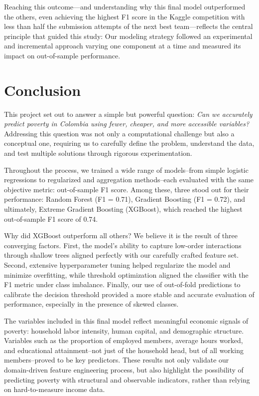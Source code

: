 \documentclass[12pt,a4paper,onecolumn]{article}
\begin{document}
Reaching this outcome—and understanding why this final model outperformed the others, even achieving the highest F1 score in the Kaggle competition with less than half the submission attempts of the next best team—reflects the central principle that guided this study: Our modeling strategy followed an experimental and incremental approach varying one component at a time and measured its impact on out-of-sample performance. 

\section{Conclusion}

This project set out to answer a simple but powerful question: \textit{Can we accurately predict poverty in Colombia using fewer, cheaper, and more accessible variables?} Addressing this question was not only a computational challenge but also a conceptual one, requiring us to carefully define the problem, understand the data, and test multiple solutions through rigorous experimentation.

Throughout the process, we trained a wide range of models--from simple logistic regressions to regularized and aggregation methods--each evaluated with the same objective metric: out-of-sample F1 score. Among these, three stood out for their performance: Random Forest (F1 = 0.71), Gradient Boosting (F1 = 0.72), and ultimately, Extreme Gradient Boosting (XGBoost), which reached the highest out-of-sample F1 score of 0.74. 

Why did XGBoost outperform all others? We believe it is the result of three converging factors. First, the model’s ability to capture low-order interactions through shallow trees aligned perfectly with our carefully crafted feature set. Second, extensive hyperparameter tuning helped regularize the model and minimize overfitting, while threshold optimization aligned the classifier with the F1 metric under class imbalance. Finally, our use of out-of-fold predictions to calibrate the decision threshold provided a more stable and accurate evaluation of performance, especially in the presence of skewed classes.

The variables included in this final model reflect meaningful economic signals of poverty: household labor intensity, human capital, and demographic structure. Variables such as the proportion of employed members, average hours worked, and educational attainment--not just of the household head, but of all working members--proved to be key predictors. These results not only validate our domain-driven feature engineering process, but also highlight the possibility of predicting poverty with structural and observable indicators, rather than relying on hard-to-measure income data.
\end{document}
